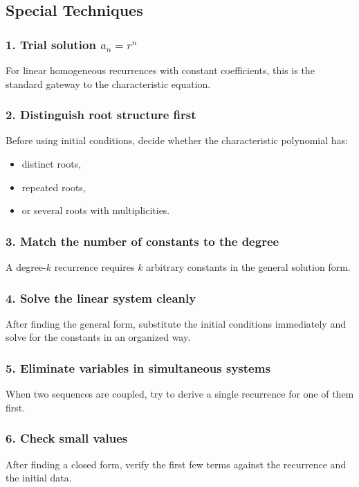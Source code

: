 \subsection{Special Techniques}

\subsubsection*{1. Trial solution \(a_n=r^n\)}
For linear homogeneous recurrences with constant coefficients, this is the standard gateway to the characteristic equation.

\subsubsection*{2. Distinguish root structure first}
Before using initial conditions, decide whether the characteristic polynomial has:
\begin{itemize}[leftmargin=*]
    \item distinct roots,
    \item repeated roots,
    \item or several roots with multiplicities.
\end{itemize}

\subsubsection*{3. Match the number of constants to the degree}
A degree-$k$ recurrence requires $k$ arbitrary constants in the general solution form.

\subsubsection*{4. Solve the linear system cleanly}
After finding the general form, substitute the initial conditions immediately and solve for the constants in an organized way.

\subsubsection*{5. Eliminate variables in simultaneous systems}
When two sequences are coupled, try to derive a single recurrence for one of them first.

\subsubsection*{6. Check small values}
After finding a closed form, verify the first few terms against the recurrence and the initial data.


